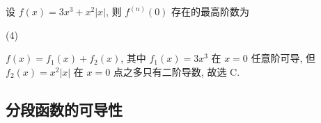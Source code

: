 \begin{example}[1992 数一]
    设 $f(x)=3x^{3}+x^2|x|$, 则 $f^{(n)}(0)$ 存在的最高阶数为
    \begin{tasks}(4)
    \end{tasks}
\end{example}
\begin{solution}
    $f(x)=f_1(x)+f_2(x)$, 其中 $f_1(x)=3x^3$ 在 $x=0$ 任意阶可导, 但 $f_2(x)=x^2|x|$ 在 $x=0$ 点之多只有二阶导数, 故选 C.
\end{solution}

\subsection{分段函数的可导性}

% 

